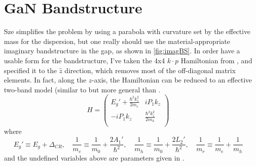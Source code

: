 \section{GaN Bandstructure}
Sze simplifies the problem by using a parabola with curvature set by the effective mass for the dispersion, but one really should use the material-appropriate imaginary bandstructure in the gap, as shown in \ref{fig:imagBS}.  In order have a usable form for the bandstructure, I've taken the 4x4 $k\cdot p$ Hamiltonian from \cite{Rinke_2008}, and specified it to the $\hat{z}$ direction, which removes most of the off-diagonal matrix elements.  In fact, along the $z$-axis, the Hamiltonian can be reduced to an effective two-band model (similar to but more general than \cite{Kane_1960}.
\[
  H=\begin{pmatrix}
    E_g'+\frac{\hbar^2k_z^2}{2m_e} & iP_1k_z\\
    -iP_1k_z & \frac{\hbar^2k_z^2}{2m_h} \\
  \end{pmatrix}
\]
where
\[
  E_g'\equiv E_g+\Delta_{CR}, \quad \frac{1}{m_e}\equiv\frac{1}{m_0}+\frac{2A_1'}{\hbar^2}, \quad \frac{1}{m_h}\equiv\frac{1}{m_0}+\frac{2L_2'}{\hbar^2}, \quad
\frac{1}{m_r}\equiv\frac{1}{m_e}+\frac{1}{m_h}
\]
and the undefined variables above are parameters given in \cite{Rinke_2008}.



